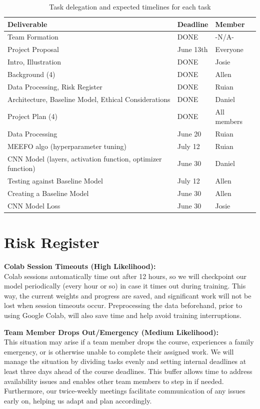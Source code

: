 \documentclass{article} %
\begin{document}
\begin{table}[h]
\centering
\caption{Task delegation and expected timelines for each task}
\label{tab:deliverables}
\begin{tabular}{lll}
\toprule
\textbf{Deliverable} & \textbf{Deadline} & \textbf{Member} \\
\midrule
Team Formation & DONE & -N/A- \\
Project Proposal & June 13th & Everyone \\
Intro, Illustration & DONE & Josie \\
Background (4) & DONE & Allen \\
Data Processing, Risk Register & DONE & Ruian \\
Architecture, Baseline Model, Ethical Considerations & DONE & Daniel \\
Project Plan (4) & DONE & All members \\
Data Processing & June 20 & Ruian \\
MEEFO algo (hyperparameter tuning) & July 12 & Ruian \\
CNN Model (layers, activation function, optimizer function) & June 30 & Daniel \\
Testing against Baseline Model & July 12 & Allen \\
Creating a Baseline Model & June 30 & Allen \\
CNN Model Loss & June 30 & Josie \\
\bottomrule
\end{tabular}
\end{table}

\section{Risk Register}

\textbf{Colab Session Timeouts (High Likelihood):} \\
Colab sessions automatically time out after 12 hours, so we will checkpoint our model periodically (every hour or so) in case it times out during training. This way, the current weights and progress are saved, and significant work will not be lost when session timeouts occur. Preprocessing the data beforehand, prior to using Google Colab, will also save time and help avoid training interruptions.

\textbf{Team Member Drops Out/Emergency (Medium Likelihood):} \\
This situation may arise if a team member drops the course, experiences a family emergency, or is otherwise unable to complete their assigned work. We will manage the situation by dividing tasks evenly and setting internal deadlines at least three days ahead of the course deadlines. This buffer allows time to address availability issues and enables other team members to step in if needed. Furthermore, our twice-weekly meetings facilitate communication of any issues early on, helping us adapt and plan accordingly.
\end{document}
